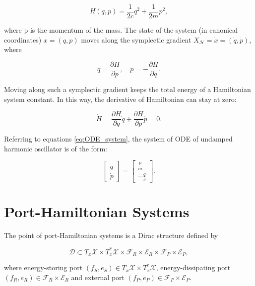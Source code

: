 \documentclass[
	parskip, 			   %
	twoside, 			   %
	DIV=14, 			   %
	BCOR=15.0mm, 		   %
	headsepline, 		   %
	open=right, 		   %
	captions=tableheading, %
	bibliography=totoc,    %
	numbers=noenddot       %
]{scrreprt}
\begin{document}
\begin{equation}
    \label{eq:Hamiltonian_udho}
    H(q,p)=\frac{1}{2c}q^2+\frac{1}{2m}p^2,
\end{equation}

where p is the momentum of the mass. The state of the system (in canonical coordinates) $x=(q,p)$ moves along the symplectic gradient $X_{\mathcal{H}} = \dot{x}=(\dot{q},\dot{p})$, where

\begin{equation}
    \label{eq:symplectic_gradient}
    \dot{q}=\frac{\partial H}{\partial p}, \quad \dot{p}=-\frac{\partial H}{\partial q}.
\end{equation}

Moving along such a symplectic gradient keeps the total energy of a Hamiltonian system constant. In this way, the derivative of Hamiltonian can stay at zero:

\begin{equation}
    \label{eq:derivative_Hamiltonian}
    \dot{H}=\frac{\partial H}{\partial q}\dot{q}+\frac{\partial H}{\partial p}\dot{p}=0.
\end{equation}

Referring to equations \ref{eq:ODE_system}, the system of ODE of undamped harmonic oscillator is of the form:

\begin{equation}
    \label{eq:ODE_undamped_harmonic_oscillator}
    \begin{bmatrix}
    \dot{q}\\
    \dot{p}
    \end{bmatrix}
    =
    \begin{bmatrix}
    \frac{p}{m}\\
    -\frac{q}{c}
    \end{bmatrix}.
\end{equation}

\section{Port-Hamiltonian Systems}
The point of port-Hamiltonian systems is a Dirac structure defined by

\begin{equation}
    \label{eq:Dirac_structure}
    \mathcal{D} \subset T_{x}\mathcal{X} \times T_{x}^{*}\mathcal{X} \times \mathcal{F}_R \times \mathcal{E}_R \times \mathcal{F}_P \times \mathcal{E}_P,
\end{equation}

where energy-storing port $(f_S, e_S) \in T_{x}\mathcal{X} \times T_{x}^{*}\mathcal{X}$, energy-dissipating port $(f_R, e_R) \in \mathcal{F}_R \times \mathcal{E}_R$ and external port $(f_P, e_P) \in \mathcal{F}_P \times \mathcal{E}_P$.
\end{document}
